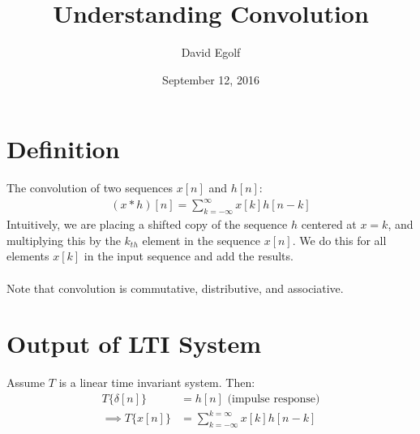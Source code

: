 \documentclass[a4paper]{article}
\title{Understanding Convolution}
\author{David Egolf}
\date{September 12, 2016}
\newcommand{\op}[2]{#1\{#2\}}
\begin{document}
\maketitle

\section*{Definition}
The convolution of two sequences $x[n]$ and $h[n]$:
\begin{align*}
(x*h)[n] = \sum_{k=-\infty}^{\infty}x[k]h[n-k]
\end{align*}
Intuitively, we are placing a shifted copy of the sequence $h$ centered at $x = k$, and multiplying this by the $k_{th}$ element in the sequence $x[n]$. We do this for all elements $x[k]$ in the input sequence and add the results.
\\\\
Note that convolution is commutative, distributive, and associative.
\section*{Output of LTI System}
Assume $T$ is a linear time invariant system. Then:
\begin{align*}
\op{T}{\delta[n]} &= h[n] \text{ (impulse response)}\\
\implies \op{T}{x[n]} &= \sum_{k=-\infty}^{k=\infty}x[k]h[n-k]
\end{align*}
\end{document}
